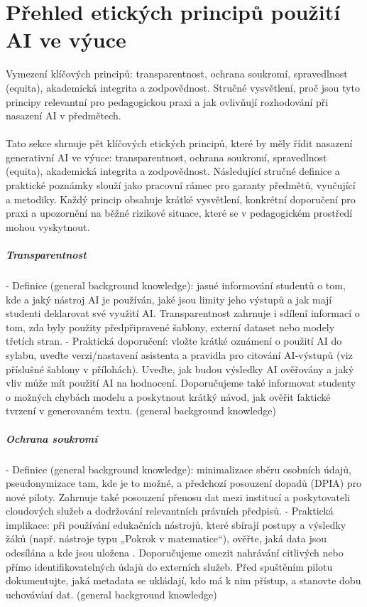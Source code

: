 \documentclass{report}%
\begin{document}
\section{Přehled etických principů použití AI ve výuce}%
Vymezení klíčových principů: transparentnost, ochrana soukromí, spravedlnost (equita), akademická integrita a zodpovědnost. Stručné vysvětlení, proč jsou tyto principy relevantní pro pedagogickou praxi a jak ovlivňují rozhodování při nasazení AI v předmětech.%


%
\paragraph{}
Tato sekce shrnuje pět klíčových etických principů, které by měly řídit nasazení generativní AI ve výuce: transparentnost, ochrana soukromí, spravedlnost (equita), akademická integrita a zodpovědnost. Následující stručné definice a praktické poznámky slouží jako pracovní rámec pro garanty předmětů, vyučující a metodiky. Každý princip obsahuje krátké vysvětlení, konkrétní doporučení pro praxi a upozornění na běžné rizikové situace, které se v pedagogickém prostředí mohou vyskytnout.

\subparagraph{Transparentnost}
- Definice (general background knowledge): jasné informování studentů o tom, kde a jaký nástroj AI je používán, jaké jsou limity jeho výstupů a jak mají studenti deklarovat své využití AI. Transparentnost zahrnuje i sdílení informací o tom, zda byly použity předpřipravené šablony, externí dataset nebo modely třetích stran.
- Praktická doporučení: vložte krátké oznámení o použití AI do sylabu, uveďte verzi/nastavení asistenta a pravidla pro citování AI‑výstupů (viz příslušné šablony v přílohách). Uveďte, jak budou výsledky AI ověřovány a jaký vliv může mít použití AI na hodnocení. Doporučujeme také informovat studenty o možných chybách modelu a poskytnout krátký návod, jak ověřit faktické tvrzení v generovaném textu. (general background knowledge)

\subparagraph{Ochrana soukromí}
- Definice (general background knowledge): minimalizace sběru osobních údajů, pseudonymizace tam, kde je to možné, a předchozí posouzení dopadů (DPIA) pro nové piloty. Zahrnuje také posouzení přenosu dat mezi institucí a poskytovateli cloudových služeb a dodržování relevantních právních předpisů.
- Praktická implikace: při používání edukačních nástrojů, které sbírají postupy a výsledky žáků (např. nástroje typu „Pokrok v matematice“), ověřte, jaká data jsou odesílána a kde jsou uložena \cite{kb_ai_101_tipu_pdf_04e4a115_page_8_1}. Doporučujeme omezit nahrávání citlivých nebo přímo identifikovatelných údajů do externích služeb. Před spuštěním pilotu dokumentujte, jaká metadata se ukládají, kdo má k nim přístup, a stanovte dobu uchovávání dat. (general background knowledge)
\end{document}

